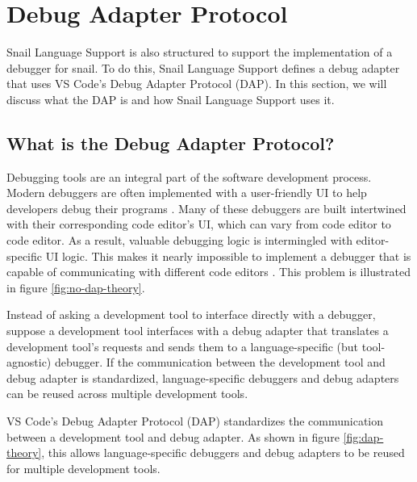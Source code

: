 \documentclass{article}
\begin{document}
\section{Debug Adapter Protocol}

Snail Language Support is also structured to support the implementation of a debugger for snail. To do this, Snail Language Support defines a debug adapter that uses VS Code's Debug Adapter Protocol (DAP). In this section, we will discuss what the DAP is and how Snail Language Support uses it.

\subsection{What is the Debug Adapter Protocol?}

Debugging tools are an integral part of the software development process. Modern debuggers are often implemented with a user-friendly UI to help developers debug their programs \cite{Microsoft_2022b,Matloff_Salzman_2008,Sinha_2017}. Many of these debuggers are built intertwined with their corresponding code editor's UI, which can vary from code editor to code editor. As a result, valuable debugging logic is intermingled with editor-specific UI logic. This makes it nearly impossible to implement a debugger that is capable of communicating with different code editors \cite{Microsoft_2021a}. This problem is illustrated in figure \ref{fig:no-dap-theory}.

Instead of asking a development tool to interface directly with a debugger, suppose a development tool interfaces with a debug adapter that translates a development tool's requests and sends them to a language-specific (but tool-agnostic) debugger. If the communication between the development tool and debug adapter is standardized, language-specific debuggers and debug adapters can be reused across multiple development tools. 

VS Code's Debug Adapter Protocol (DAP) standardizes the communication between a development tool and debug adapter. As shown in figure \ref{fig:dap-theory}, this allows language-specific debuggers and debug adapters to be reused for multiple development tools.
\end{document}
